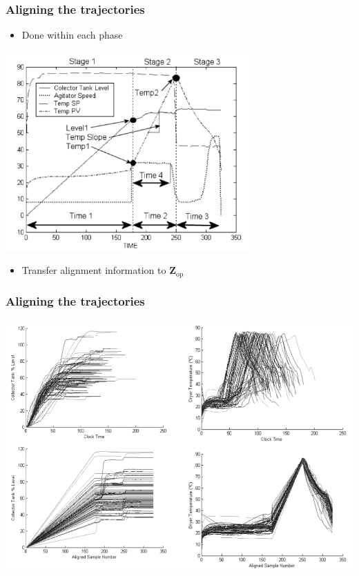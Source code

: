 \begin{frame}\frametitle{Aligning the trajectories}

	\begin{itemize}
		\item	Done within each phase
	\end{itemize}
	\begin{center}
		\includegraphics[width=0.7\textwidth]{images/fmc/fmc-alignment-points.png}
	\end{center}
	\begin{itemize}
		\item	Transfer alignment information to  \( \mathbf{Z}_\text{op}\)
	\end{itemize}
\end{frame}

\begin{frame}\frametitle{Aligning the trajectories}

	\begin{center}
		\includegraphics[width=\textwidth]{images/fmc/fmc-alignment-phase1-phase2.png}
	\end{center}

\end{frame}

